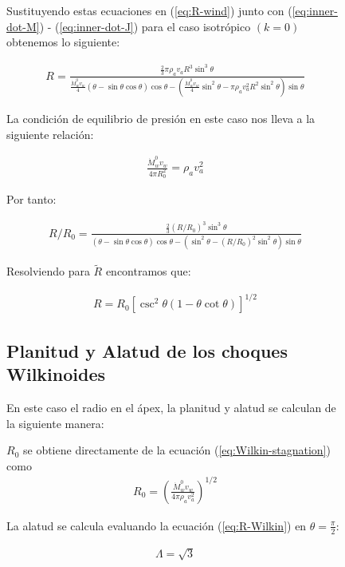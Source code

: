 \begin{figure}
Sustituyendo estas ecuaciones en (\ref{eq:R-wind}) junto con (\ref{eq:inner-dot-M}) - (\ref{eq:inner-dot-J}) para el caso isotrópico $(k=0)$ obtenemos lo siguiente:
\small

\begin{align}
  R = \frac{\frac{2}{3}\pi\rho_a v_a R^3 \sin^3\theta}{\frac{\dot{M}^0_w v_w}{4}\left(\theta-\sin\theta\cos\theta\right)\cos\theta
  - \left(\frac{\dot{M}^0_w v_w}{4}\sin^2\theta - \pi\rho_a v^2_a R^2 \sin^2\theta\right)\sin\theta}
\end{align}
\normalsize

La condición de equilibrio de presión en este caso nos lleva a la siguiente relación:

\begin{align}
  \frac{\dot{M}^0_w v_w}{4\pi R^2_0} = \rho_a v^2_a \label{eq:Wilkin-stagnation}
\end{align}

Por tanto:

\begin{align}
  R/R_0 = \frac{\frac{2}{3}\left(R/R_0\right)^3 \sin^3\theta}{\left(\theta-\sin\theta\cos\theta\right)\cos\theta
  - \left(\sin^2\theta - \left(R/R_0\right)^2 \sin^2\theta\right)\sin\theta}
\end{align}


Resolviendo para $\tilde{R}$ encontramos que:

\begin{align}
  R = R_0\left[\csc^2\theta\left(1 - \theta\cot\theta\right)\right]^{1/2} \label{eq:R-Wilkin}
\end{align}

\subsection{Planitud y Alatud de los choques Wilkinoides}
\label{sec:Wilkin-Char-Radii}

En este caso el radio en el ápex, la planitud y alatud se calculan de la siguiente manera:

$R_0$ se obtiene directamente de la ecuación (\ref{eq:Wilkin-stagnation}) como
\begin{align}
  R_0 = \left(\frac{\dot{M}^0_w v_w}{4\pi \rho_a v^2_a}\right)^{1/2}
\end{align}

La alatud se calcula evaluando la ecuación (\ref{eq:R-Wilkin}) en $\theta=\frac{\pi}{2}$:

\begin{align}
  \Lambda = \sqrt{3} \label{eq:R90-Wilkin}
\end{align}


\end{figure}
